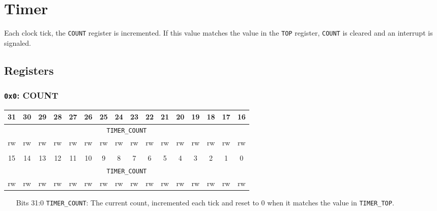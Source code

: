 \documentclass[11pt,openany]{report}
\begin{document}
\section{Timer}
Each clock tick, the \verb|COUNT| register is incremented. If
this value matches the value in the \verb|TOP| register,
\verb|COUNT| is cleared and an interrupt is signaled.

\subsection{Registers}
\subsubsection{\texttt{0x0}: COUNT}

\begin{center}
  \begin{tabular}{|c|c|c|c|c|c|c|c|c|c|c|c|c|c|c|c|}
    \hline
    31 & 30 & 29 & 28 & 27 & 26 & 25 & 24 & 23 & 22 & 21 & 20 & 19 & 18 & 17 & 16 \\
    \hline
    \multicolumn{16}{|c|}{\texttt{TIMER\_COUNT}}\\
    \hline
    rw & rw & rw & rw & rw & rw & rw & rw & rw & rw & rw & rw & rw & rw & rw & rw\\
    \hline
    \multicolumn{16}{c}{}\\
    \hline
    15 & 14 & 13 & 12 & 11 & 10 & 9 & 8 & 7 & 6 & 5 & 4 & 3 & 2 & 1 & 0 \\
    \hline
    \multicolumn{16}{|c|}{\texttt{TIMER\_COUNT}}\\
    \hline
    rw & rw & rw & rw & rw & rw & rw & rw & rw & rw & rw & rw & rw & rw & rw & rw\\
    \hline
  \end{tabular}
\end{center}

\begin{enumerate}
\item[Bits 31:0] \verb|TIMER_COUNT|: The current count, incremented
  each tick and reset to 0 when it matches the value in
  \verb|TIMER_TOP|.
\end{enumerate}
\end{document}
